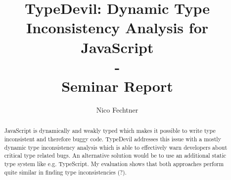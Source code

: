 \documentclass[runningheads,a4paper]{llncs}
\newcommand{\keywords}[1]{\par\addvspace\baselineskip

\noindent\keywordname\enspace\ignorespaces#1}
\begin{document}

\mainmatter  %

\title{TypeDevil: Dynamic Type Inconsistency Analysis for JavaScript\\-\\Seminar Report}


\author{Nico Fechtner}
%


%
%

\toctitle{}
\tocauthor{}
\maketitle

\tableofcontents
\newpage

\begin{abstract}
JavaScript is dynamically and weakly typed which makes it possible to write type inconsistent and therefore buggy code. 
TypeDevil addresses this issue with a mostly dynamic type inconsistency analysis which is able to effectively warn developers about critical type related bugs.
An alternative solution would be to use an additional static type system like e.g. TypeScript.
My evaluation shows that both approaches perform quite similar in finding type inconsistencies (?).
\end{abstract}
\end{document}

